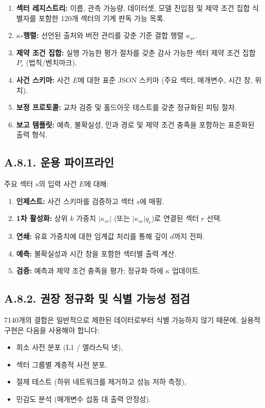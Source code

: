 \documentclass[13pt,a4paper]{article}
\begin{document}
	\begin{enumerate}[leftmargin=*]
		\item \textbf{섹터 레지스트리:} 이름, 관측 가능량, 데이터셋, 모델 진입점 및 제약 조건 집합 식별자를 포함한 120개 섹터의 기계 판독 가능 목록.
		\item \textbf{$\kappa$-행렬:} 선언된 출처와 버전 관리를 갖춘 기준 결합 행렬 $\kappa_{sr}$.
		\item \textbf{제약 조건 집합:} 실행 가능한 평가 절차를 갖춘 감사 가능한 섹터 제약 조건 집합 $P_r$ (법칙/벤치마크).
		\item \textbf{사건 스키마:} 사건 $E$에 대한 표준 JSON 스키마 (주요 섹터, 매개변수, 시간 창, 위치).
		\item \textbf{보정 프로토콜:} 교차 검증 및 홀드아웃 테스트를 갖춘 정규화된 피팅 절차.
		\item \textbf{보고 템플릿:} 예측, 불확실성, 인과 경로 및 제약 조건 충족을 포함하는 표준화된 출력 형식.
	\end{enumerate}
	
	\subsection*{A.8.1. 운용 파이프라인}
	주요 섹터 $s$의 입력 사건 $E$에 대해:
	\begin{enumerate}[leftmargin=*]
		\item \textbf{인제스트:} 사건 스키마를 검증하고 섹터 $s$에 매핑.
		\item \textbf{1차 활성화:} 상위 $k$ 가중치 $|\kappa_{sr}|$ (또는 $|\kappa_{sr}|q_r$)로 연결된 섹터 $r$ 선택.
		\item \textbf{연쇄:} 유효 가중치에 대한 임계값 처리를 통해 깊이 $d$까지 전파.
		\item \textbf{예측:} 불확실성과 시간 창을 포함한 섹터별 출력 계산.
		\item \textbf{검증:} 예측과 제약 조건 충족을 평가; 정규화 하에 $\kappa$ 업데이트.
	\end{enumerate}
	
	\subsection*{A.8.2. 권장 정규화 및 식별 가능성 점검}
	7140개의 결합은 일반적으로 제한된 데이터로부터 식별 가능하지 않기 때문에, 실용적 구현은 다음을 사용해야 합니다:
	\begin{itemize}[leftmargin=*]
		\item 희소 사전 분포 (L1 / 엘라스틱 넷),
		\item 섹터 그룹별 계층적 사전 분포,
		\item 절제 테스트 (하위 네트워크를 제거하고 성능 저하 측정),
		\item 민감도 분석 (매개변수 섭동 대 출력 안정성).
	\end{itemize}
	
\end{document}
